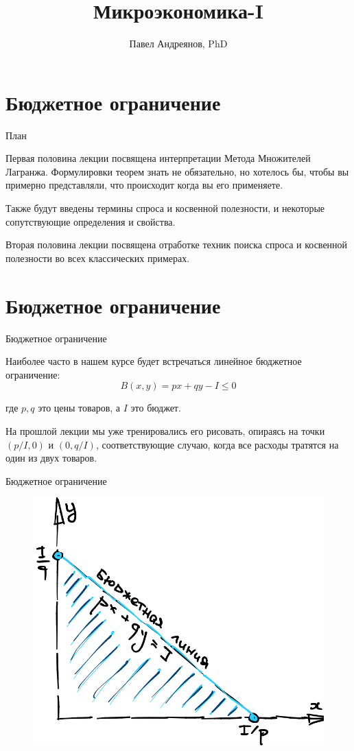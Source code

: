 \documentclass{beamer}
\title{
Микроэкономика-I
}
\author{
Павел Андреянов, PhD
}
\begin{document}
\maketitle

\section{Бюджетное ограничение}

\begin{frame}{План}

Первая половина лекции посвящена интерпретации Метода Множителей Лагранжа. Формулировки теорем знать не обязательно, но хотелось бы, чтобы вы примерно представляли, что происходит когда вы его применяете. 

Также будут введены термины спроса и косвенной полезности, и некоторые сопутствующие определения и свойства.

Вторая половина лекции посвящена отработке техник поиска спроса и косвенной полезности во всех классических примерах.

\end{frame}


\section{Бюджетное ограничение}

\begin{frame}{Бюджетное ограничение}

Наиболее часто в нашем курсе будет встречаться линейное бюджетное ограничение:
$$ B(x,y) = p x + q y - I \leqslant 0$$

где $p, q$ это цены товаров, а $I$ это бюджет. 

На прошлой лекции мы уже тренировались его рисовать, опираясь на точки $(p/I, 0)$ и $(0, q/I)$, соответствующие случаю, когда все расходы тратятся на один из двух товаров.

\end{frame}

\begin{frame}{Бюджетное ограничение}

\begin{figure}[hbt]
\centering
\includegraphics[width=.8 \textwidth]{budget_2d.png}
\end{figure}

\end{frame}
\end{document}
